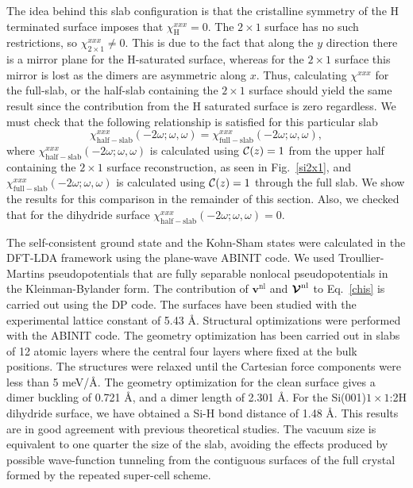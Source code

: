 \documentclass[floatfix,prb,aps,superscriptaddress,showpacs,11pt,preprint,letterpaper]{revtex4}
\begin{document}
The idea behind this slab configuration is that the 
cristalline symmetry of the H terminated surface imposes that 
$\chi_{\mathrm{H}}^{xxx}=0$.
 The $2\times 1$ surface has no 
such restrictions, so $\chi_{2\times 1}^{xxx}\ne 0$.
This is due to the fact that along the $y$ direction there is a mirror plane for the
H-saturated surface, whereas 
for the $2\times 1$ surface this mirror is lost as the dimers are
asymmetric along $x$. 
Thus, calculating $\chi^{xxx}$ for the full-slab, or the 
half-slab containing the $2\times 1$ surface\cite{note1}
should yield the same result since the contribution from the H
saturated surface is zero regardless. 
We must check that the following 
relationship is satisfied for this particular slab
\begin{equation*}
\chi_{\mathrm{half-slab}}^{xxx}(-2\omega;\omega,\omega) 
=
\chi_{\mathrm{full-slab}}^{xxx}(-2\omega;\omega,\omega) 
,
\end{equation*}
where
$\chi_{\mathrm{half-slab}}^{xxx}(-2\omega;\omega,\omega)$ is calculated using
${\mathbf{\cal C}}(z)=1$ from the upper half containing the $2\times 1$ 
surface reconstruction, as seen in Fig.~\ref{si2x1},
and $\chi_{\mathrm{full-slab}}^{xxx}(-2\omega;\omega,\omega)$ is calculated using
${\mathbf{\cal C}}(z)=1$ through the full slab.
We show the results for this comparison in the remainder  
of this section.  
Also, we checked that 
for the
dihydride surface
$\chi_{\mathrm{half-slab}}^{xxx}(-2\omega;\omega,\omega)=0$.

The self-consistent ground state and the Kohn-Sham states were
calculated in the DFT-LDA framework using the plane-wave 
ABINIT code.\cite{abinit}
We used Troullier-Martins pseudopotentials\cite{troullierPRB91} that are 
fully separable nonlocal pseudopotentials in the Kleinman-Bylander 
form.\cite{kleinmanPRL82}
The contribution of $\mathbf{v}^\mathrm{nl}$ 
and 
$\boldsymbol{\mathcal{\cal V}}^\mathrm{nl}$ 
to Eq.~\eqref{chis} is carried out 
using the DP code.\cite{olevanoDP}
The surfaces have been studied with the experimental lattice constant of 5.43 \AA. 
Structural optimizations were performed 
with the ABINIT code.\cite{abinit}  
The geometry optimization has been carried out in slabs of 12
atomic layers where the central four layers where fixed at the bulk
positions.  
The structures were relaxed until the Cartesian force components were less than 5 meV/\AA. 
The geometry optimization for the clean surface gives
a dimer buckling of 0.721 \AA, and a dimer length of 2.301 \AA.  
For the  Si(001)$1\times 1$:2H dihydride surface, we have obtained a Si-H bond distance of 1.48 \AA. 
This results are in good agreement with previous 
theoretical studies.\cite{caramellaPRB09,mendozaPRB06}
The vacuum size is equivalent to one quarter the
size of the slab, avoiding the effects produced by possible 
wave-function tunneling from the contiguous surfaces of the full
crystal formed by the repeated super-cell scheme.\cite{mendozaPRB06}    
\end{document}
